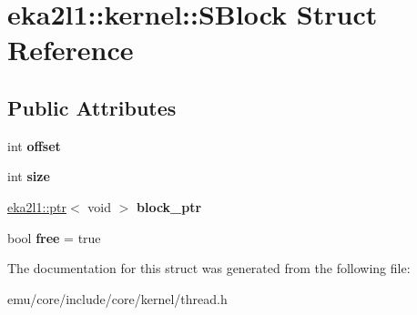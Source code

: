 \hypertarget{structeka2l1_1_1kernel_1_1_s_block}{}\section{eka2l1\+:\+:kernel\+:\+:S\+Block Struct Reference}
\label{structeka2l1_1_1kernel_1_1_s_block}
\subsection*{Public Attributes}
\begin{DoxyCompactItemize}
\item 
\mbox{\label{structeka2l1_1_1kernel_1_1_s_block_a3278a6721614d2e83f11c04a714a1004}} 
int {\bfseries offset}
\item 
\mbox{\label{structeka2l1_1_1kernel_1_1_s_block_a1ea3c07b5d2b62280e124bf6675b6815}} 
int {\bfseries size}
\item 
\mbox{\label{structeka2l1_1_1kernel_1_1_s_block_aff23eb107bd23d5f0fafd2c8a66472d4}} 
\mbox{\hyperlink{classeka2l1_1_1ptr}{eka2l1\+::ptr}}$<$ void $>$ {\bfseries block\+\_\+ptr}
\item 
\mbox{\label{structeka2l1_1_1kernel_1_1_s_block_a6cd42cacc1aa51a858daf77ca280894b}} 
bool {\bfseries free} = true
\end{DoxyCompactItemize}


The documentation for this struct was generated from the following file\+:\begin{DoxyCompactItemize}
\item 
emu/core/include/core/kernel/thread.\+h\end{DoxyCompactItemize}
